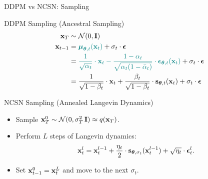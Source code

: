 \documentclass{beamer}
\begin{document}
\begin{frame}{DDPM vs NCSN: Sampling}
	\begin{block}{DDPM Sampling (Ancestral Sampling)}
			\vspace{-0.7cm}
			\begin{align*}
				\mathbf{x}_T &\sim \mathcal{N}(0, \mathbf{I}) \\
				\mathbf{x}_{t - 1} &= {\color{teal}\boldsymbol{\mu}_{\boldsymbol{\theta}, t}(\mathbf{x}_t)} + \sigma_t \cdot \boldsymbol{\epsilon} \\
				& ={\color{teal}\frac{1}{\sqrt{\alpha_t}} \cdot \mathbf{x}_t - \frac{1 - \alpha_t}{\sqrt{\alpha_t (1 - \bar{\alpha}_t)}} \cdot \boldsymbol{\epsilon}_{\boldsymbol{\theta}, t}(\mathbf{x}_t)} +  \sigma_t \cdot \boldsymbol{\epsilon} \\
				& = \frac{1}{\sqrt{1 - \beta_t}} \cdot \mathbf{x}_t + \frac{\beta_t}{\sqrt{1 - \beta_t}} \cdot \mathbf{s}_{\boldsymbol{\theta}, t} (\mathbf{x}_t) +  \sigma_t \cdot \boldsymbol{\epsilon}
			\end{align*}
			\vspace{-0.5cm}
	\end{block}
	\begin{block}{NCSN Sampling (Annealed Langevin Dynamics)}
		\begin{itemize}
			\item Sample $\mathbf{x}_T^0 \sim \mathcal{N}(0, \sigma_T^2\, \mathbf{I}) \approx q(\mathbf{x}_T)$.
			\item Perform $L$ steps of Langevin dynamics:
			\vspace{-0.2cm}
			\[
				\mathbf{x}_t^l = \mathbf{x}_t^{l-1} + \frac{\eta_t}{2} \cdot \mathbf{s}_{\boldsymbol{\theta}, \sigma_t}(\mathbf{x}_t^{l - 1}) + \sqrt{\eta_t} \cdot \boldsymbol{\epsilon}_t^l.
			\] 
			\vspace{-0.7cm}
			\item Set $\mathbf{x}_{t-1}^0 = \mathbf{x}_t^L$ and move to the next $\sigma_t$.
		\end{itemize}
	\end{block}
\end{frame}
\end{document}

